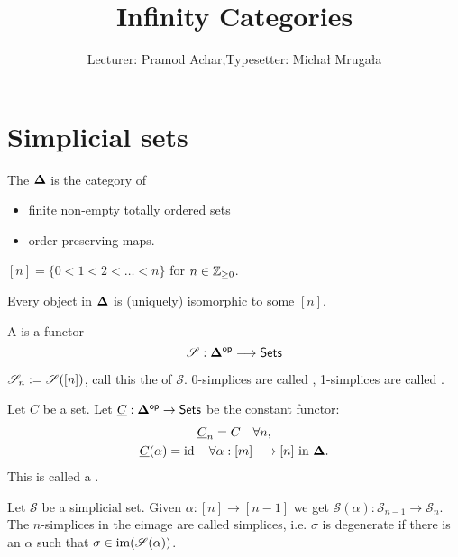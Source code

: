 

\def\CC{\mathcal C}
\def\CS{\mathcal S}
\def\CT{\mathcal T}
\def\Sing{\operatorname{Sing}}

\title{Infinity Categories}
\author{Lecturer: Pramod Achar,\quad Typesetter: Micha{\l} Mruga{\l}a}


\maketitle

\section{Simplicial sets}

\begin{definition}
	The  $\mathbf{\Delta}$ is the category of
	\begin{itemize}
		\item finite non-empty totally ordered sets
		\item order-preserving maps.
	\end{itemize}
\end{definition}
\begin{notation}
	$[n]=\{0<1<2<\dots<n\} $ for $n\in \mathbb Z_{\ge 0}$.
\end{notation}
Every object in $\mathbf{\Delta}$ is (uniquely) isomorphic to some $[n]$.
\begin{definition}
	A  is a functor
	\[
		\CS:\bb{\Delta}\op \to \Set
	\] 
\end{definition}
\begin{notation}
	$\CS_n \defeq \CS([n])$, call this the  of $\CS$. 0-simplices are called , 1-simplices are called .
\end{notation}
\begin{example}
	Let $C$ be a set. Let $\ul{C}:\bb{\Delta}\op\to \Set$ be the constant functor:
	\begin{gather*}
		\ul{C}_n = C\quad \forall n, \\
		\ul{C}(\alpha) = \id \quad \forall \alpha:[m]\to [n] \text{ in }\bb{\Delta}.
	\end{gather*}
	This is called a .
\end{example}
\begin{definition}
	Let $\CS$ be a simplicial set. Given $\alpha:[n]\to [n-1]$ we get $\CS(\alpha):\CS_{n-1}\to \CS_n$. The $n$-simplices in the eimage are called  simplices, i.e. $\sigma$ is degenerate if there is an $\alpha$ such that $\sigma\in \img(\CS(\alpha))$.
\end{definition}
